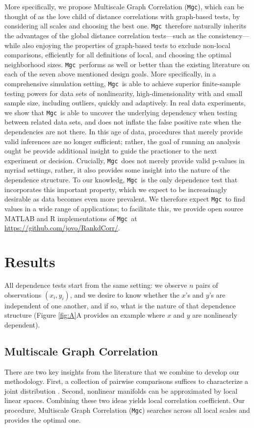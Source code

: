\documentclass[11pt]{article}
\providecommand{\sct}[1]{{\sc \texttt{#1}}}
\newcommand{\Mgc}{\sct{Mgc}}
\newcommand{\website}{\url{https://github.com/jovo/RankdCorr/}}
\begin{document}
More specifically,  we propose Multiscale Graph Correlation (\Mgc), which can be thought of as the love child of distance correlations with graph-based tests, by considering all scales and choosing the best one.  \Mgc~therefore  naturally inherits the advantages of the global distance correlation tests---such as the consistency---while also enjoying the properties of graph-based tests to exclude non-local comparisons, efficiently for all definitions of local, and choosing the optimal neighborhood sizes. \Mgc~performs as well or better than the existing literature on each of the seven above mentioned design goals. More specifically, in a comprehensive simulation setting, \Mgc~is able to achieve superior finite-sample testing powers for data sets of nonlinearity, high-dimensionality with and small sample size, including outliers, quickly and adaptively.  In real data experiments, we show that \Mgc~is able to uncover the underlying dependency when testing between related data sets,  and does not inflate the false positive rate when the dependencies are not there. 
In this age of data, procedures that merely provide valid inferences are no longer sufficient; rather, the goal of running an analysis ought be provide additional insight to guide the practioner to the next experiment or decision.  Crucially, \Mgc~does not merely provide valid p-values in myriad settings, rather, it also provides some insight into the nature of the dependence structure. To our knowledg, \Mgc~is the only dependence test that incorporates this important property, which we expect to be increasinagly desirable as data becomes even more prevalent. We therefore expect \Mgc~to find values in a wide range of applications; to facilitate this, we provide open source MATLAB and R implementations of \Mgc~at \website.

\section{Results}
\label{main}

All dependence tests start from the same setting: we observe $n$ pairs of observations $(x_i,y_i)$, and we desire to know whether the $x$'s and $y$'s are independent of one another, and if so, what is the nature of that dependence structure (Figure \ref{fig:A}A provides an example where $x$ and $y$ are nonlinearly dependent).  

\subsection{Multiscale Graph Correlation} 
\label{main1}
There are two key insights from the literature that we combine to develop our methodology.  First, a collection of pairwise comparisons  suffices to characterize a joint distribution \cite{Maa1996}.  Second, nonlinear manifolds can be approximated by local linear spaces.  Combining these two ideas yields local correlation coefficient. Our procedure, Multiscale Graph Correlation (\Mgc) searches across all local scales and provides the optimal one.   
\end{document}
